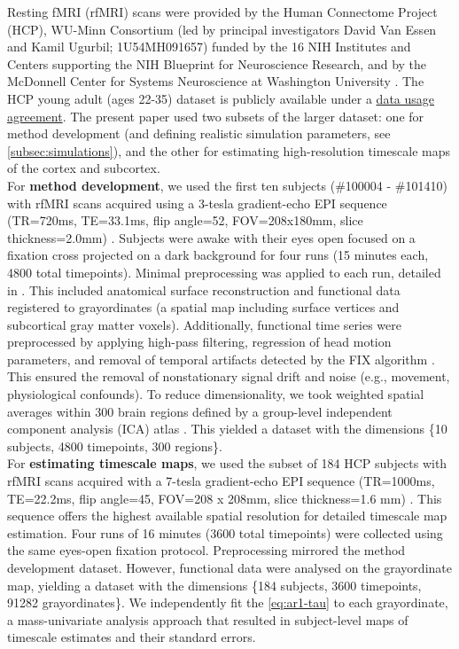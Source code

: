 \documentclass[main.tex]{subfiles}
\begin{document}
Resting fMRI (rfMRI) scans were provided by the Human Connectome Project (HCP), WU-Minn Consortium (led by principal investigators David Van Essen and Kamil Ugurbil; 1U54MH091657) funded by the 16 NIH Institutes and Centers supporting the NIH Blueprint for Neuroscience Research, and by the McDonnell Center for Systems Neuroscience at Washington University \cite{van_essen_wu-minn_2013}. The HCP young adult (ages 22-35) dataset is publicly available under a \href{https://www.humanconnectome.org/storage/app/media/data_use_terms/DataUseTerms-HCP-Open-Access-26Apr2013.pdf}{data usage agreement}. The present paper used two subsets of the larger dataset: one for method development (and defining realistic simulation parameters, see \ref{subsec:simulations}), and the other for estimating high-resolution timescale maps of the cortex and subcortex.\\

For \textbf{method development}, we used the first ten subjects (\#100004 - \#101410) with rfMRI scans acquired using a 3-tesla gradient-echo EPI sequence (TR=720ms, TE=33.1ms, flip angle=52\textdegree, FOV=208x180mm, slice thickness=2.0mm) \cite{van_essen_wu-minn_2013}. Subjects were awake with their eyes open focused on a fixation cross projected on a dark background for four runs (15 minutes each, 4800 total timepoints). Minimal preprocessing was applied to each run, detailed in \cite{glasser_minimal_2013}. This included anatomical surface reconstruction \cite{robinson_msm_2014} and functional data registered to grayordinates (a spatial map including surface vertices and subcortical gray matter voxels). Additionally, functional time series were preprocessed by applying high-pass filtering, regression of head motion parameters, and removal of temporal artifacts detected by the FIX algorithm \cite{salimi-khorshidi_automatic_2014}. This ensured the removal of nonstationary signal drift and noise (e.g., movement, physiological confounds). To reduce dimensionality, we took weighted spatial averages within 300 brain regions defined by a group-level independent component analysis (ICA) atlas \cite{smith_resting-state_2013}. This yielded a dataset with the dimensions \{10 subjects, 4800 timepoints, 300 regions\}.\\

For \textbf{estimating timescale maps}, we used the subset of 184 HCP subjects with rfMRI scans acquired with a 7-tesla gradient-echo EPI sequence (TR=1000ms, TE=22.2ms, flip angle=45\textdegree, FOV=208 x 208mm, slice thickness=1.6 mm) \cite{van_essen_wu-minn_2013, moeller_multiband_2010}. This sequence offers the highest available spatial resolution for detailed timescale map estimation. Four runs of 16 minutes (3600 total timepoints) were collected using the same eyes-open fixation protocol. Preprocessing mirrored the method development dataset. However, functional data were analysed on the grayordinate map, yielding a dataset with the dimensions \{184 subjects, 3600 timepoints, 91282 grayordinates\}. We independently fit the \eqref{eq:ar1-tau} to each grayordinate, a mass-univariate analysis approach that resulted in subject-level maps of timescale estimates and their standard errors.
\end{document}
